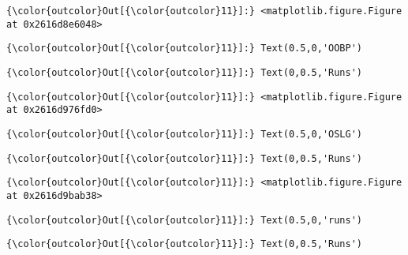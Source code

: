 \documentclass[11pt]{article}
\begin{document}
\begin{Verbatim}[commandchars=\\\{\}]
{\color{outcolor}Out[{\color{outcolor}11}]:} <matplotlib.figure.Figure at 0x2616d8e6048>
\end{Verbatim}
            
\begin{Verbatim}[commandchars=\\\{\}]
{\color{outcolor}Out[{\color{outcolor}11}]:} Text(0.5,0,'OOBP')
\end{Verbatim}
            
\begin{Verbatim}[commandchars=\\\{\}]
{\color{outcolor}Out[{\color{outcolor}11}]:} Text(0,0.5,'Runs')
\end{Verbatim}
            
\begin{Verbatim}[commandchars=\\\{\}]
{\color{outcolor}Out[{\color{outcolor}11}]:} <matplotlib.figure.Figure at 0x2616d976fd0>
\end{Verbatim}
            
\begin{Verbatim}[commandchars=\\\{\}]
{\color{outcolor}Out[{\color{outcolor}11}]:} Text(0.5,0,'OSLG')
\end{Verbatim}
            
\begin{Verbatim}[commandchars=\\\{\}]
{\color{outcolor}Out[{\color{outcolor}11}]:} Text(0,0.5,'Runs')
\end{Verbatim}
            
\begin{Verbatim}[commandchars=\\\{\}]
{\color{outcolor}Out[{\color{outcolor}11}]:} <matplotlib.figure.Figure at 0x2616d9bab38>
\end{Verbatim}
            
\begin{Verbatim}[commandchars=\\\{\}]
{\color{outcolor}Out[{\color{outcolor}11}]:} Text(0.5,0,'runs')
\end{Verbatim}
            
\begin{Verbatim}[commandchars=\\\{\}]
{\color{outcolor}Out[{\color{outcolor}11}]:} Text(0,0.5,'Runs')
\end{Verbatim}
            
\end{document}
